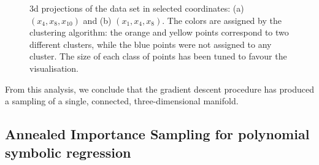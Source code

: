 \documentclass[11pt,a4paper]{article}
\begin{document}
\begin{figure}
{
		}
		\subfigure{\label{fig:3dx1x4x8}}
		\caption{3d projections of the data set in selected coordinates: (a) $(x_4, x_8, x_{10})$ and (b) $(x_1, x_4, x_8)$. The colors are assigned by the clustering algorithm: the orange and yellow points correspond to two different clusters, while the blue points were not assigned to any cluster. The size of each class of points has been tuned to favour the visualisation.}
		\label{fig:3dplots}
	\end{figure}
	
	From this analysis, we conclude that the gradient descent procedure has produced a sampling of a single, connected, three-dimensional manifold.

	\subsection{Annealed Importance Sampling for polynomial symbolic regression}
		
\end{document}
